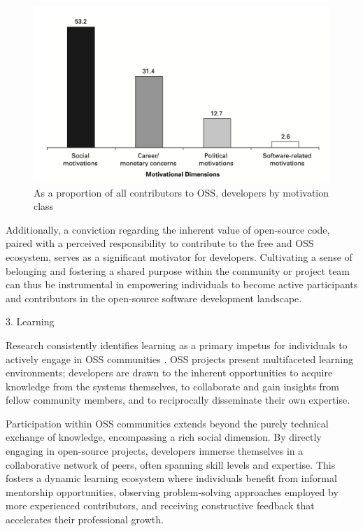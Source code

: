 \begin{figure}[ht]
    \centering
    \includegraphics[width=0.7\linewidth]{figs/motivationDimension.png}
    \caption{As a proportion of all contributors to OSS, developers by motivation class \cite{ghosh2002free}}
    \label{fig:motivationDimension}
\end{figure}

Additionally,  a conviction regarding the inherent value of open-source code, paired with a perceived responsibility to contribute to the free and OSS ecosystem, serves as a significant motivator for developers. Cultivating a sense of belonging and fostering a shared purpose within the community or project team can thus be instrumental in empowering individuals to become active participants and contributors in the open-source software development landscape.



3. Learning

Research consistently identifies learning as a primary impetus for individuals to actively engage in OSS communities \parencite{06ye2003toward, 07zhao2024openrank, 08zhang2024paid, 09lakhani2005hackers, 10wu2007empirical, 11gerosa2021shifting, 12choi2015characteristics, 17alexander2002working, 18oreg2008exploring}. OSS projects present multifaceted learning environments; developers are drawn to the inherent opportunities to acquire knowledge from the systems themselves, to collaborate and gain insights from fellow community members, and to reciprocally disseminate their own expertise.

Participation within OSS communities extends beyond the purely technical exchange of knowledge, encompassing a rich social dimension. By directly engaging in open-source projects, developers immerse themselves in a collaborative network of peers, often spanning skill levels and expertise. This fosters a dynamic learning ecosystem where individuals benefit from informal mentorship opportunities, observing problem-solving approaches employed by more experienced contributors, and receiving constructive feedback that accelerates their professional growth.

